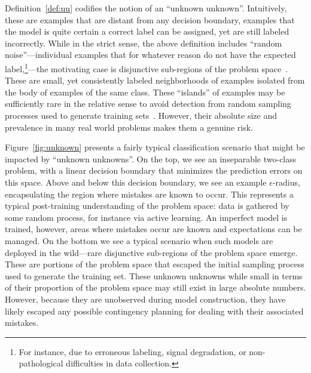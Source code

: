 Definition~\ref{def:uu} codifies the notion of an ``unknown unknown''. Intuitively, these are examples that are distant from any decision boundary, examples that the model is quite certain a correct label can be assigned, yet are still labeled incorrectly.  While in the strict sense, the above definition includes ``random noise''---individual examples that for whatever reason do not have the expected label,\footnote{For instance,  due to erroneous labeling, signal degradation, or non-pathological difficulties in data collection.}---the motivating case is disjunctive sub-regions of the problem space~\cite{weiss10disjunct}. These are small, yet consistently labeled neighborhoods of examples isolated from the body of examples of the same class. These ``islands'' of examples may be sufficiently rare in the relative sense to avoid detection from random sampling processes used to generate training sets~\cite{attenberg:2010inactive, attprov:kdd2010}. However, their absolute size and prevalence in many real world problems makes them a genuine risk.

Figure~\ref{fig:unknown} presents a fairly typical classification
scenario that might be impacted by ``unknown unknowns''. On the top,
we see an inseparable two-class problem, with a linear decision
boundary that minimizes the prediction errors on this space. Above and
below this decision boundary, we see an example $\epsilon$-radius,
encapsulating the region where mistakes are known to occur. This
represents a typical post-training understanding of the problem space: 
data is gathered by some random process, for instance via active
learning. An imperfect model is trained, however, areas where mistakes
occur are known and expectations can be managed. On the bottom we see
a typical scenario when such models are deployed in the wild---rare
disjunctive sub-regions of the problem space emerge.  These are portions of the
problem space that escaped the initial sampling process used to generate
the training set. These unknown unknowns while small in terms of their
proportion of the problem space may still exist in large absolute
numbers.  However, because they are unobserved during model
construction, they have likely escaped any possible contingency
planning for dealing with their associated mistakes.


